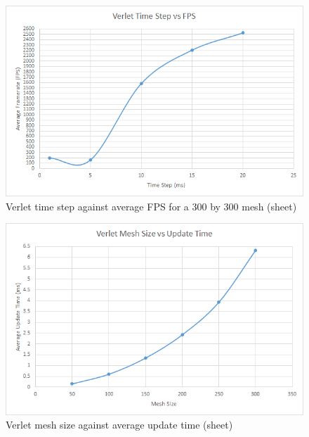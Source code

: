     \begin{figure}
    \begin{center}
      \includegraphics[scale=.9]{Figures/sheet_v_ts_fps}
    \end{center}
    \caption{Verlet time step against average FPS for a 300 by 300 mesh (sheet)}
    \label{fig:v step fps sheet}
  \end{figure}
  
    \begin{figure}
    \begin{center}
      \includegraphics[scale=.9]{Figures/sheet_v_m_ut}
    \end{center}
    \caption{Verlet mesh size against average update time (sheet)}
    \label{fig:v mesh update sheet}
  \end{figure}
  
